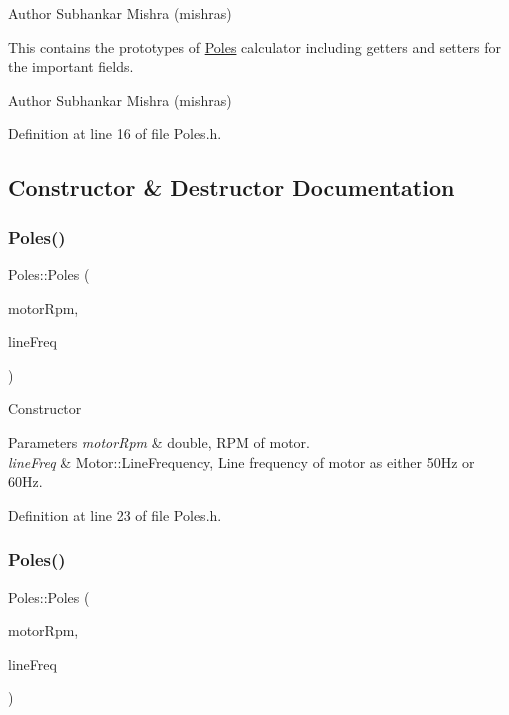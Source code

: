 \begin{DoxyAuthor}{Author}
Subhankar Mishra (mishras) 
\end{DoxyAuthor}


This contains the prototypes of \hyperlink{class_poles}{Poles} calculator including getters and setters for the important fields.

\begin{DoxyAuthor}{Author}
Subhankar Mishra (mishras) 
\end{DoxyAuthor}


Definition at line 16 of file Poles.\+h.



\subsection{Constructor \& Destructor Documentation}
\mbox{\label{class_poles_aade5d01dab7a461e582449e5bb17f6d6}} 
\subsubsection{\texorpdfstring{Poles()}{Poles()}\hspace{0.1cm}{\footnotesize\ttfamily [1/3]}}
{\footnotesize\ttfamily Poles\+::\+Poles (\begin{DoxyParamCaption}\item[{double}]{motor\+Rpm,  }\item[{Motor\+::\+Line\+Frequency}]{line\+Freq }\end{DoxyParamCaption})\hspace{0.3cm}{\ttfamily [inline]}}

Constructor 
\begin{DoxyParams}{Parameters}
{\em motor\+Rpm} & double, R\+PM of motor. \\
\hline
{\em line\+Freq} & Motor\+::\+Line\+Frequency, Line frequency of motor as either 50\+Hz or 60\+Hz. \\
\hline
\end{DoxyParams}


Definition at line 23 of file Poles.\+h.

\mbox{\label{class_poles_aade5d01dab7a461e582449e5bb17f6d6}} 
\subsubsection{\texorpdfstring{Poles()}{Poles()}\hspace{0.1cm}{\footnotesize\ttfamily [2/3]}}
{\footnotesize\ttfamily Poles\+::\+Poles (\begin{DoxyParamCaption}\item[{double}]{motor\+Rpm,  }\item[{Motor\+::\+Line\+Frequency}]{line\+Freq }\end{DoxyParamCaption})\hspace{0.3cm}{\ttfamily [inline]}}

